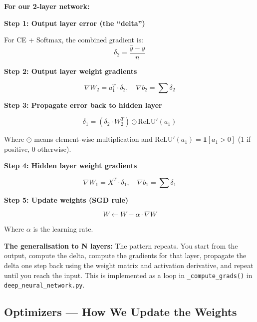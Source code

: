 \documentclass[12pt, a4paper]{article}
\begin{document}
\textbf{For our 2-layer network:}

\textbf{Step 1: Output layer error (the ``delta'')}

For CE + Softmax, the combined gradient is:
\begin{equation}
  \delta_2 = \frac{\hat{y} - y}{n}
\end{equation}

\textbf{Step 2: Output layer weight gradients}

\begin{equation}
  \nabla W_2 = a_1^T \cdot \delta_2, \quad \nabla b_2 = \sum \delta_2
\end{equation}

\textbf{Step 3: Propagate error back to hidden layer}

\begin{equation}
  \delta_1 = (\delta_2 \cdot W_2^T) \odot \text{ReLU}'(a_1)
\end{equation}

Where $\odot$ means element-wise multiplication and $\text{ReLU}'(a_1) = \mathbf{1}[a_1 > 0]$ (1 if positive, 0 otherwise).

\textbf{Step 4: Hidden layer weight gradients}

\begin{equation}
  \nabla W_1 = X^T \cdot \delta_1, \quad \nabla b_1 = \sum \delta_1
\end{equation}

\textbf{Step 5: Update weights (SGD rule)}

\begin{equation}
  W \leftarrow W - \alpha \cdot \nabla W
\end{equation}

Where $\alpha$ is the learning rate.

\textbf{The generalisation to N layers:} The pattern repeats. You start from the output, compute the delta, compute the gradients for that layer, propagate the delta one step back using the weight matrix and activation derivative, and repeat until you reach the input. This is implemented as a loop in \texttt{\_compute\_grads()} in \texttt{deep\_neural\_network.py}.

\subsection{Optimizers --- How We Update the Weights}
\end{document}
